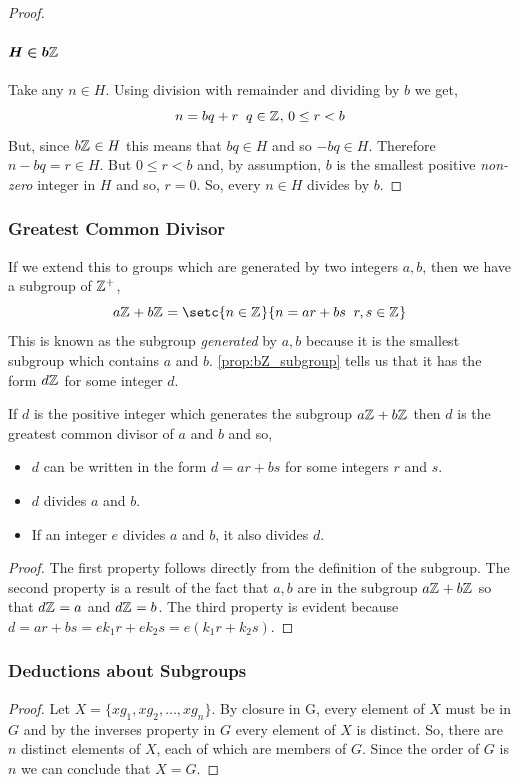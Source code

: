 \documentclass[MathsNotesBase.tex]{subfiles}
\begin{document}
{\begin{proof}
			\paragraph{$\bm{H \in b\mathbb{Z}^{}}$}
			Take any $n \in H$. Using division with remainder and dividing by $b$ we get,
			\[ n = bq + r \;\; q \in \mathbb{Z}^{},\, 0 \leq r < b \]
			But, since $b\mathbb{Z}^{} \in H$ this means that $bq \in H$ and so $-bq \in H$. Therefore $n - bq = r \in H$. But $0 \leq r < b$ and, by assumption, $b$ is the smallest positive \textit{non-zero} integer in $H$ and so, $r = 0$. So, every $n \in H$ divides by $b$.
		\end{proof}
	
		\subsubsection{Greatest Common Divisor}
		If we extend this to groups which are generated by two integers $a,b$, then we have a subgroup of $\mathbb{Z}^{+}$,
		\[ a\Z{} + b\Z{} = \setc{n \in \Z{}}{n = ar + bs \;\; r, s \in \Z{}} \]
		This is known as the subgroup \textit{generated} by $a,b$ because it is the smallest subgroup which contains $a$ and $b$. \autoref{prop:bZ_subgroup} tells us that it has the form $d\mathbb{Z}^{}$ for some integer $d$.
		\begin{corollary}
			\label{coro:greatest_common_divisor}
			If $d$ is the positive integer which generates the subgroup $a\mathbb{Z}^{} + b\mathbb{Z}^{}$ then $d$ is the greatest common divisor of $a$ and $b$ and so,
			\begin{itemize}
				\item{$d$ can be written in the form $d = ar + bs$ for some integers $r$ and $s$.}
				\item{$d$ divides $a$ and $b$.}
				\item{If an integer $e$ divides $a$ and $b$, it also divides $d$.}
			\end{itemize}
		\end{corollary} 
		\begin{proof}
			The first property follows directly from the definition of the subgroup. The second property is a result of the fact that $a,b$ are in the subgroup $a\mathbb{Z}^{} + b\mathbb{Z}^{}$ so that $d\mathbb{Z}^{} = a$ and $d\mathbb{Z}^{} = b$. The third property is evident because $d = ar + bs = ek_1r + ek_2s = e(k_1r + k_2s)$.
		\end{proof}
	
		\bigskip
		\subsubsection{Deductions about Subgroups}\bigskip
		\begin{proof}
			Let ${ X = \{xg_1, xg_2, \dots , xg_n\} }$. By closure in G, every element of $X$ must be in $G$ and by the inverses property in $G$ every element of $X$ is distinct. So, there are $n$ distinct elements of $X$, each of which are members of $G$. Since the order of $G$ is $n$ we can conclude that ${ X = G }$.
		\end{proof}
	
}
\end{document}
